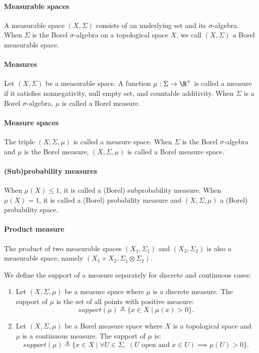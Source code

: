 \paragraph{Measurable spaces} A measurable space $(X, \Sigma)$ consists of an underlying set and its $\sigma$-algebra.  
When $\Sigma$ is the Borel $\sigma$-algebra on a topological space $X$, we call $(X, \Sigma)$ a Borel measurable space.

\paragraph{Measures} Let $(X,\Sigma)$ be a measurable space. A function $\mu : \Sigma \to \R^+$ is called a measure if it satisfies nonnegativity, null empty set, and countable additivity. 
When $\Sigma$ is a Borel $\sigma$-algebra, $\mu$ is called a Borel measure.

\paragraph{Measure spaces} The triple $(X, \Sigma, \mu)$ is called a measure space.
 When $\Sigma$ is the Borel $\sigma$-algebra and $\mu$ is the Borel measure, $(X, \Sigma, \mu)$ is called a Borel measure space.

\paragraph{(Sub)probability measures} When $\mu(X) \leq 1$, it is called a (Borel) subprobability measure. When $\mu(X) = 1$, it is called a (Borel) probability measure and $(X, \Sigma, \mu)$ a (Borel) probability space.

\paragraph{Product measure} The product of two measurable spaces $(X_1, \Sigma_1)$ and $(X_2, \Sigma_2)$ is also a measurable space, namely $(X_1 \times X_2, \Sigma_1 \otimes \Sigma_2)$.

\begin{definition}[Support]
	We define the support of a measure separately for discrete and continuous cases:
	\begin{enumerate}
		\item Let $(X, \Sigma, \mu)$ be a measure space where $\mu$ is a discrete measure. The support of $\mu$ is the set of all points with positive measure:
		\[
			{support}(\mu) \triangleq \{ x \in X \mid \mu(x) > 0 \}.
		\]

		\item Let $(X, \Sigma, \mu)$ be a Borel measure space where $X$ is a topological space and $\mu$ is a continuous measure. The support of $\mu$ is:
		\[
			{support}(\mu) \triangleq \{ x \in X \mid \forall U \in \Sigma, \; (U \text{ open and } x \in U) \implies \mu(U) > 0 \}.
		\]
	\end{enumerate}
\end{definition}

